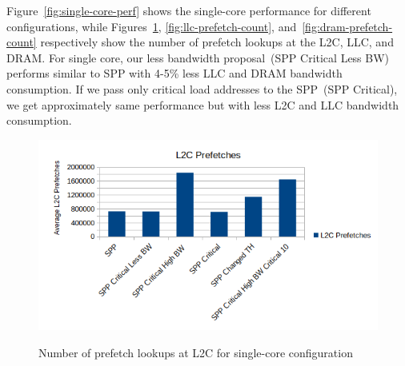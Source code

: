 Figure~\ref{fig:single-core-perf} shows the single-core performance for different configurations, while Figures~\ref{fig:l2c-prefetch-count}, \ref{fig:llc-prefetch-count}, and~\ref{fig:dram-prefetch-count} respectively show the number of prefetch lookups at the L2C, LLC, and DRAM.
For single core, our less bandwidth proposal~(SPP Critical Less BW) performs similar to SPP with 4-5\% less LLC and DRAM bandwidth consumption. If we pass only critical load addresses to the SPP~(SPP Critical), we get approximately same performance but with less L2C and LLC bandwidth consumption.
\begin{figure}[H]
{\includegraphics[scale=0.7]{images/single_core_L2C_BW.png}}
\caption{Number of prefetch lookups at L2C for single-core configuration}
\label{fig:l2c-prefetch-count}
\end{figure}

